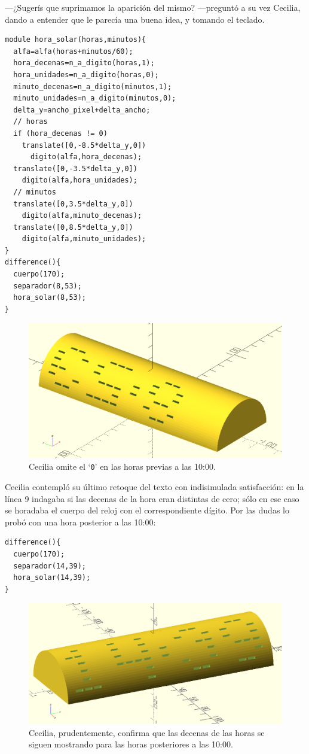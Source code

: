 ---¿Sugerís que suprimamos la aparición del mismo? ---pre\-gun\-tó a su
vez Cecilia, dando a entender que le parecía una buena idea, y tomando
el teclado.

\begin{lstlisting}
module hora_solar(horas,minutos){
  alfa=alfa(horas+minutos/60);
  hora_decenas=n_a_digito(horas,1);
  hora_unidades=n_a_digito(horas,0);
  minuto_decenas=n_a_digito(minutos,1);
  minuto_unidades=n_a_digito(minutos,0);                    
  delta_y=ancho_pixel+delta_ancho;
  // horas    
  if (hora_decenas != 0)
    translate([0,-8.5*delta_y,0])
      digito(alfa,hora_decenas);
  translate([0,-3.5*delta_y,0])
    digito(alfa,hora_unidades);  
  // minutos
  translate([0,3.5*delta_y,0])
    digito(alfa,minuto_decenas);
  translate([0,8.5*delta_y,0])
    digito(alfa,minuto_unidades);  
}
difference(){
  cuerpo(170);
  separador(8,53);
  hora_solar(8,53);
}
\end{lstlisting}%

\begin{figure}[ht]
  \centering
  \includegraphics[width=.75\textwidth]{imagenes/8_53}
  \caption{Cecilia omite el `\texttt{0}' en las horas previas a las
    10:00.}
  \label{fig:8_53}
\end{figure}
  

Cecilia contempló su último retoque del texto con indisimulada
satisfacción: en la línea 9 indagaba si las decenas de la hora eran
distintas de cero; sólo en ese caso se horadaba el cuerpo del reloj
con el correspondiente dígito. Por las dudas lo probó con una hora
posterior a las 10:00:


\begin{lstlisting}
difference(){
  cuerpo(170);
  separador(14,39);
  hora_solar(14,39);
}
\end{lstlisting}

\begin{figure}[ht]
  \centering
  \includegraphics[width=.75\textwidth]{imagenes/14_39}
  \caption{Cecilia, prudentemente, confirma que las decenas de las
    horas se siguen mostrando para las horas posteriores a las 10:00.}
  \label{fig:14_39}
\end{figure}
  

